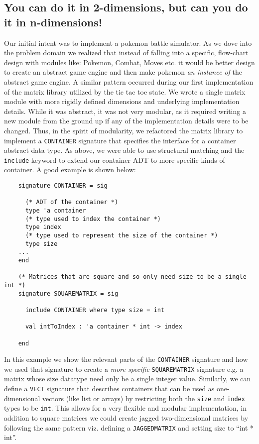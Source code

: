 \documentclass[9pt,letterpaper]{extarticle}
\begin{document}
  \subsection{You can do it in 2-dimensions, but can you do it in n-dimensions!}
  Our initial intent was to implement a pokemon battle simulator. As we
  dove into the problem domain we realized that instead of falling into a
  specific, flow-chart design with modules like: Pokemon, Combat, Moves etc. it
  would be better design to create an abstract game engine and then make pokemon
  \textit{an instance of} the abstract game engine. A similar pattern occurred
  during our first implementation of the matrix library utilized by the tic tac
  toe state. We wrote a single matrix module with more rigidly defined 
  dimensions and underlying implementation details. While it was abstract, it was not very modular,
  as it required writing a new module from the ground up if any of the 
  implementation details were to be changed. Thus, in the spirit of modularity, we refactored the matrix
  library to implement a \texttt{CONTAINER} signature that specifies the interface for
  a container abstract data type. As above, we were able to use structural matching and the
  \texttt{include} keyword to extend our container ADT to more specific kinds of container. A good
  example is shown below:

  \begin{verbatim}
    signature CONTAINER = sig
    
      (* ADT of the container *)
      type 'a container
      (* type used to index the container *)
      type index
      (* type used to represent the size of the container *)
      type size
    ...
    end

    (* Matrices that are square and so only need size to be a single int *)
    signature SQUAREMATRIX = sig
    
      include CONTAINER where type size = int
    
      val intToIndex : 'a container * int -> index
    
    end

  \end{verbatim}
  In this example we show the relevant parts of the \texttt{CONTAINER} signature
  and how we used that signature to create a \textit{more specific}
  \texttt{SQUAREMATRIX} signature e.g. a matrix whose size datatype need only be
  a single integer value. Similarly, we can define a \texttt{VECT} signature that describes
  containers that can be used as one-dimensional vectors (like list or arrays) by restricting 
  both the \texttt{size} and \texttt{index} types to be \texttt{int}.
  This allows for a very flexible and modular
  implementation, in addition to square matrices we could create jagged two-dimensional matrices
  by following the same pattern viz. defining a \texttt{JAGGEDMATRIX} and
  setting size to ``int * int''.
\end{document}
